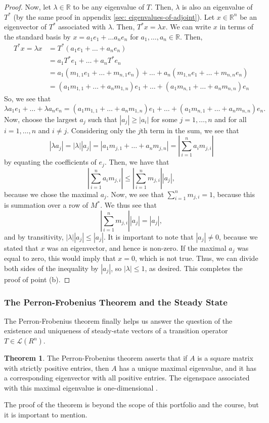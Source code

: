 \documentclass{article}
\renewcommand{\L}{\mathcal{L}}
\newcommand{\R}{\mathbb{R}}
\theoremstyle{definition}
\newtheorem{theorem}{Theorem}
\begin{document}
\begin{proof}
    Now, let $\lambda \in \R$ to be any eigenvalue of $T$. Then, $\lambda$ is also an eigenvalue of $T^*$ (by the same proof in appendix \ref{sec: eigenvalues-of-adjoint}). Let $x \in \R^n$ be an eigenvector of $T^*$ associated with $\lambda$. Then, $T^*x = \lambda x$. We can write $x$ in terms of the standard basis by $x = a_1e_1 + \dots a_ne_n$ for $a_1, \dots, a_n \in \R$. Then, 
    \begin{align*}
        T^*x = \lambda x &= T^*(a_1e_1 + \dots + a_ne_n) \\
        &= a_1T^*e_1 + \dots + a_nT^*e_n \\
        &= a_1(m_{1, 1}e_1 + \dots + m_{n, 1}e_n) + \dots + a_n(m_{1, n}e_1 + \dots + m_{n, n}e_n) \\
        &= (a_1m_{1, 1} + \dots + a_nm_{1, n})e_1 + \dots + (a_1m_{n, 1} + \dots + a_nm_{n, n})e_n
    \end{align*}
    So, we see that $$\lambda a_1 e_1 + \dots + \lambda a_n e_n = (a_1m_{1, 1} + \dots + a_nm_{1, n})e_1 + \dots + (a_1m_{n, 1} + \dots + a_nm_{n, n})e_n.$$ Now, choose the largest $a_j$ such that $|a_j| \geq |a_i|$ for some $j = 1, \dots, n$ and for all $i = 1, \dots, n$ and $i \neq j$. Considering only the $j$th term in the sum, we see that $$|\lambda a_j| = |\lambda||a_j| = |a_1m_{j, 1} + \dots + a_nm_{j, n}| = \left|\sum_{i = 1}^n a_im_{j, i}\right|$$ by equating the coefficients of $e_j$. Then, we have that $$\left|\sum_{i = 1}^n a_im_{j, i}\right| \leq \left| \sum_{i = 1}^n m_{j, i} \right| |a_j|,$$ because we chose the maximal $a_j$. Now, we see that $\sum_{i = 1}^n m_{j, i} = 1$, because this is summation over a row of $M^*$. We thus see that $$\left| \sum_{i = 1}^n m_{j, i} \right| |a_j| = |a_j|,$$ and by transitivity, $|\lambda| |a_j| \leq |a_j|$. It is important to note that $|a_j| \neq 0$, because we stated that $x$ was an eigenvector, and hence is non-zero. If the maximal $a_j$ was equal to zero, this would imply that $x = 0$, which is not true. Thus, we can divide both sides of the inequality by $|a_j|$, so $|\lambda| \leq 1$, as desired. This completes the proof of point (b). 
\end{proof}

\subsubsection{The Perron-Frobenius Theorem and the Steady State}

The Perron-Frobenius theorem finally helps us answer the question of the existence and uniqueness of steady-state vectors of a transition operator $T \in \L(R^n)$. 
\begin{theorem}\label{thm: perron-frobenius}
The Perron-Frobenius theorem asserts that if $A$ is a square matrix with strictly positive entries, then $A$ has a unique maximal eigenvalue, and it has a corresponding eigenvector with all positive entries. The eigenspace associated with this maximal eigenvalue is one-dimensional \cite{knill_2011_linear}. 
\end{theorem}
The proof of the theorem is beyond the scope of this portfolio and the course, but it is important to mention.
\end{document}
